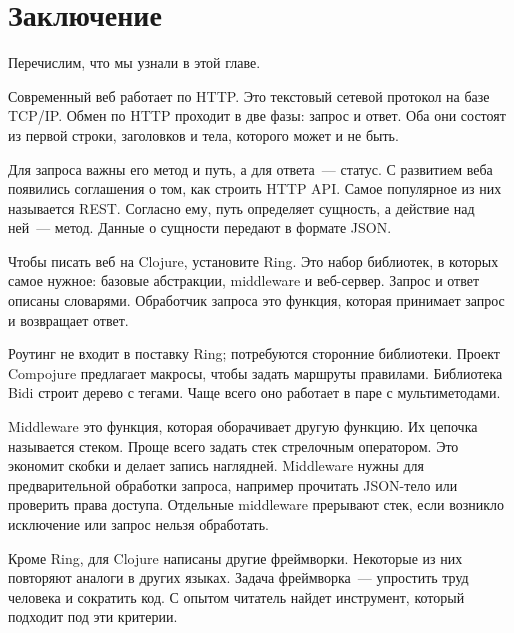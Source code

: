 \section{Заключение}

Перечислим, что мы узнали в этой главе.

Современный веб работает по HTTP. Это текстовый сетевой протокол на базе
TCP/IP. Обмен по HTTP проходит в две фазы: запрос и ответ. Оба они состоят из
первой строки, заголовков и тела, которого может и не быть.

Для запроса важны его метод и путь, а для ответа~--- статус. С развитием веба
появились соглашения о том, как строить HTTP API. Самое популярное из них
называется REST. Согласно ему, путь определяет сущность, а действие над ней~---
метод. Данные о сущности передают в формате JSON.

Чтобы писать веб на Clojure, установите Ring. Это набор библиотек, в которых
самое нужное: базовые абстракции, middleware и веб-сервер. Запрос и ответ
описаны словарями. Обработчик запроса это функция, которая принимает запрос и
возвращает ответ.

Роутинг не входит в поставку Ring; потребуются сторонние библиотеки. Проект
Compojure предлагает макросы, чтобы задать маршруты правилами. Библиотека Bidi
строит дерево с тегами. Чаще всего оно работает в паре с мультиметодами.

Middleware это функция, которая оборачивает другую функцию. Их цепочка
называется стеком. Проще всего задать стек стрелочным оператором. Это экономит
скобки и делает запись наглядней. Middleware нужны для предварительной обработки
запроса, например прочитать JSON-тело или проверить права доступа. Отдельные
middleware прерывают стек, если возникло исключение или запрос нельзя
обработать.

Кроме Ring, для Clojure написаны другие фреймворки. Некоторые из них повторяют
аналоги в других языках. Задача фреймворка~--- упростить труд человека и
сократить код. С опытом читатель найдет инструмент, который подходит под эти
критерии.
